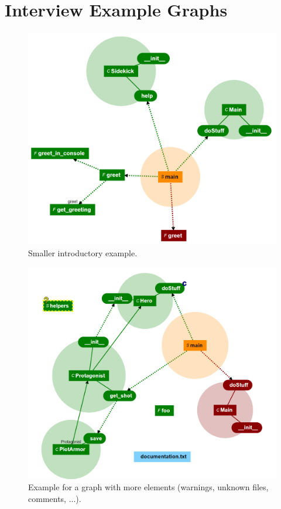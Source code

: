 \documentclass[a4paper,11pt,twoside]{article}
\theoremstyle{definition} %
\begin{document}
\section{Interview Example Graphs} \label{App:InterviewExampleGraphs}
\captionsetup[figure]{list=no}
\begin{figure}[h]
    \centering
    \includegraphics[width=1.0\textwidth]{Subfigures/Appendices/Interview_Examples/example_small.PNG}
    \caption{Smaller introductory example.}
\end{figure}

\begin{figure}[h!]
    \centering
    \includegraphics[width=1.0\textwidth]{Subfigures/Appendices/Interview_Examples/example_big.PNG}
    \caption{Example for a graph with more elements (warnings, unknown files, comments, ...).}
\end{figure}
\end{document}
